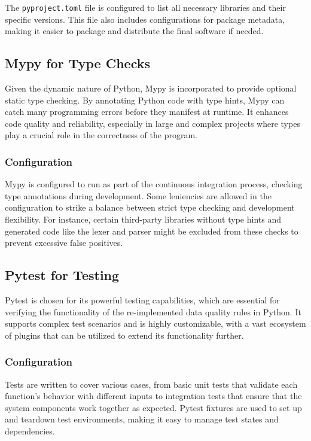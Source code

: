The \texttt{pyproject.toml} file is configured to list all necessary libraries and their specific versions. This file also includes configurations for package metadata, making it easier to package and distribute the final software if needed.

\subsection{Mypy for Type Checks}

Given the dynamic nature of Python, Mypy is incorporated to provide optional static type checking. By annotating Python code with type hints, Mypy can catch many programming errors before they manifest at runtime. It enhances code quality and reliability, especially in large and complex projects where types play a crucial role in the correctness of the program.

\subsubsection{Configuration}
Mypy is configured to run as part of the continuous integration process, checking type annotations during development. Some leniencies are allowed in the configuration to strike a balance between strict type checking and development flexibility. For instance, certain third-party libraries without type hints and generated code like the lexer and parser might be excluded from these checks to prevent excessive false positives.

\subsection{Pytest for Testing}

Pytest is chosen for its powerful testing capabilities, which are essential for verifying the functionality of the re-implemented data quality rules in Python. It supports complex test scenarios and is highly customizable, with a vast ecosystem of plugins that can be utilized to extend its functionality further.\cite{pytest}

\subsubsection{Configuration}

Tests are written to cover various cases, from basic unit tests that validate each function's behavior with different inputs to integration tests that ensure that the system components work together as expected. Pytest fixtures are used to set up and teardown test environments, making it easy to manage test states and dependencies.\cite{pytest_fixtures}


